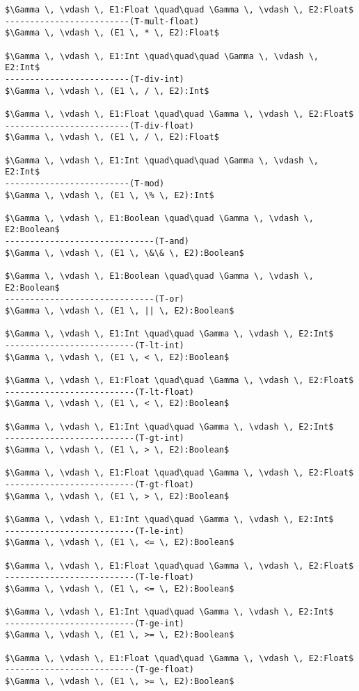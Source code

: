 \documentclass[11pt, a4paper]{article}
\begin{document}
\begin{lstlisting}
$\Gamma \, \vdash \, E1:Float \quad\quad \Gamma \, \vdash \, E2:Float$
-------------------------(T-mult-float)
$\Gamma \, \vdash \, (E1 \, * \, E2):Float$

$\Gamma \, \vdash \, E1:Int \quad\quad\quad \Gamma \, \vdash \, E2:Int$
-------------------------(T-div-int)
$\Gamma \, \vdash \, (E1 \, / \, E2):Int$

$\Gamma \, \vdash \, E1:Float \quad\quad \Gamma \, \vdash \, E2:Float$
-------------------------(T-div-float)
$\Gamma \, \vdash \, (E1 \, / \, E2):Float$

$\Gamma \, \vdash \, E1:Int \quad\quad\quad \Gamma \, \vdash \, E2:Int$
-------------------------(T-mod)
$\Gamma \, \vdash \, (E1 \, \% \, E2):Int$

$\Gamma \, \vdash \, E1:Boolean \quad\quad \Gamma \, \vdash \, E2:Boolean$
------------------------------(T-and)
$\Gamma \, \vdash \, (E1 \, \&\& \, E2):Boolean$

$\Gamma \, \vdash \, E1:Boolean \quad\quad \Gamma \, \vdash \, E2:Boolean$
------------------------------(T-or)
$\Gamma \, \vdash \, (E1 \, || \, E2):Boolean$

$\Gamma \, \vdash \, E1:Int \quad\quad \Gamma \, \vdash \, E2:Int$
--------------------------(T-lt-int)
$\Gamma \, \vdash \, (E1 \, < \, E2):Boolean$

$\Gamma \, \vdash \, E1:Float \quad\quad \Gamma \, \vdash \, E2:Float$
--------------------------(T-lt-float)
$\Gamma \, \vdash \, (E1 \, < \, E2):Boolean$

$\Gamma \, \vdash \, E1:Int \quad\quad \Gamma \, \vdash \, E2:Int$
--------------------------(T-gt-int)
$\Gamma \, \vdash \, (E1 \, > \, E2):Boolean$

$\Gamma \, \vdash \, E1:Float \quad\quad \Gamma \, \vdash \, E2:Float$
--------------------------(T-gt-float)
$\Gamma \, \vdash \, (E1 \, > \, E2):Boolean$

$\Gamma \, \vdash \, E1:Int \quad\quad \Gamma \, \vdash \, E2:Int$
--------------------------(T-le-int)
$\Gamma \, \vdash \, (E1 \, <= \, E2):Boolean$

$\Gamma \, \vdash \, E1:Float \quad\quad \Gamma \, \vdash \, E2:Float$
--------------------------(T-le-float)
$\Gamma \, \vdash \, (E1 \, <= \, E2):Boolean$

$\Gamma \, \vdash \, E1:Int \quad\quad \Gamma \, \vdash \, E2:Int$
--------------------------(T-ge-int)
$\Gamma \, \vdash \, (E1 \, >= \, E2):Boolean$

$\Gamma \, \vdash \, E1:Float \quad\quad \Gamma \, \vdash \, E2:Float$
--------------------------(T-ge-float)
$\Gamma \, \vdash \, (E1 \, >= \, E2):Boolean$


\end{lstlisting}
\end{document}
